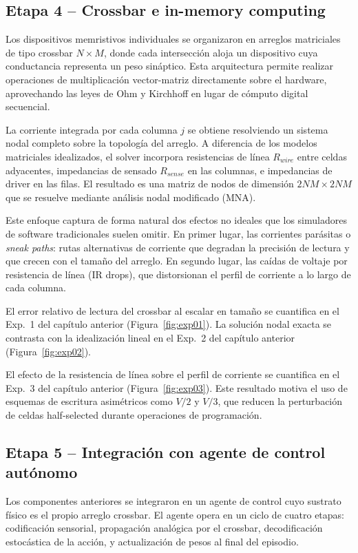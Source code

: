 \subsection{Etapa 4 -- Crossbar e in-memory computing}

Los dispositivos memristivos individuales se organizaron en 
arreglos matriciales de tipo crossbar $N \times M$, donde cada 
intersección aloja un dispositivo cuya conductancia representa un 
peso sináptico. Esta arquitectura permite realizar operaciones de 
multiplicación vector-matriz directamente sobre el hardware, 
aprovechando las leyes de Ohm y Kirchhoff en lugar de cómputo 
digital secuencial.

La corriente integrada por cada columna $j$ se obtiene resolviendo 
un sistema nodal completo sobre la topología del arreglo. A 
diferencia de los modelos matriciales idealizados, el solver 
incorpora resistencias de línea $R_{wire}$ entre celdas adyacentes, 
impedancias de sensado $R_{sense}$ en las columnas, e impedancias 
de driver en las filas. El resultado es una matriz de nodos de 
dimensión $2NM \times 2NM$ que se resuelve mediante análisis nodal 
modificado (MNA).

Este enfoque captura de forma natural dos efectos no ideales que 
los simuladores de software tradicionales suelen omitir. En primer 
lugar, las corrientes parásitas o \textit{sneak paths}: rutas 
alternativas de corriente que degradan la precisión de lectura y 
que crecen con el tamaño del arreglo. En segundo lugar, las caídas 
de voltaje por resistencia de línea (IR drops), que distorsionan 
el perfil de corriente a lo largo de cada columna.

El error relativo de lectura del crossbar al escalar en tamaño se
cuantifica en el Exp.~1 del capítulo anterior (Figura~\ref{fig:exp01}).
La solución nodal exacta se contrasta con la idealización lineal en el
Exp.~2 del capítulo anterior (Figura~\ref{fig:exp02}).

El efecto de la resistencia de línea sobre el perfil de corriente se
cuantifica en el Exp.~3 del capítulo anterior (Figura~\ref{fig:exp03}).
Este resultado motiva el uso de esquemas de escritura asimétricos como
$V/2$ y $V/3$, que reducen la perturbación de celdas half-selected
durante operaciones de programación.
\subsection{Etapa 5 -- Integración con agente de control autónomo}

Los componentes anteriores se integraron en un agente de 
control cuyo sustrato físico es el propio arreglo crossbar. El 
agente opera en un ciclo de cuatro etapas: codificación 
sensorial, propagación analógica por el crossbar, decodificación 
estocástica de la acción, y actualización de pesos al final del 
episodio.

